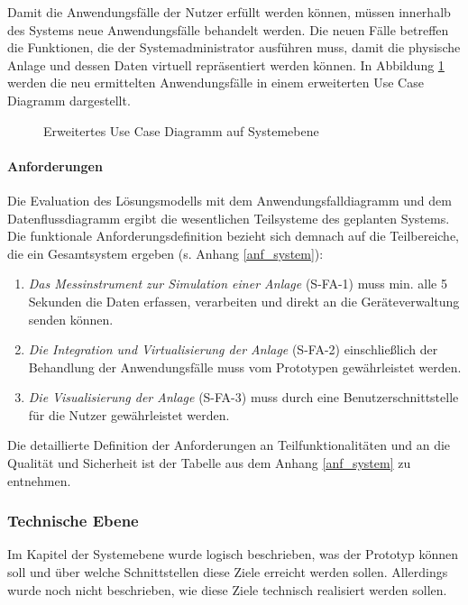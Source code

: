 Damit die Anwendungsfälle der Nutzer erfüllt werden können, müssen innerhalb des Systems neue Anwendungsfälle behandelt werden. Die neuen Fälle betreffen die Funktionen, die der Systemadministrator ausführen muss, damit die physische Anlage und dessen Daten virtuell repräsentiert werden können. In Abbildung \ref{usecasediagram} werden die neu ermittelten Anwendungsfälle in einem erweiterten Use Case Diagramm dargestellt.

\begin{figure}[ht!]
  \centering
  \noindent{}
  \caption[Erweitertes Use Case Diagramm auf Systemebene]{Erweitertes Use Case Diagramm auf Systemebene}
  \label{usecasediagram}
\end{figure}
\paragraph{Anforderungen}

Die Evaluation des Lösungsmodells mit dem Anwendungsfalldiagramm und dem Datenflussdiagramm ergibt die wesentlichen Teilsysteme des geplanten Systems. Die funktionale Anforderungsdefinition bezieht sich demnach auf die Teilbereiche, die ein Gesamtsystem ergeben (s. Anhang \ref{anf_system}):
\begin{enumerate}
  \item \textit{Das Messinstrument zur Simulation einer Anlage} (S-FA-1) muss min. alle 5 Sekunden die Daten erfassen, verarbeiten und direkt an die Geräteverwaltung senden können.
  \item \textit{Die Integration und Virtualisierung der Anlage} (S-FA-2) einschließlich der Behandlung der Anwendungsfälle muss vom Prototypen gewährleistet werden.
  \item \textit{Die Visualisierung der Anlage} (S-FA-3) muss durch eine Benutzerschnittstelle für die Nutzer gewährleistet werden.
\end{enumerate}

\noindent Die detaillierte Definition der Anforderungen an Teilfunktionalitäten und an die Qualität und Sicherheit ist der Tabelle aus dem Anhang \ref{anf_system} zu entnehmen.

\subsubsection{Technische Ebene}
Im Kapitel der Systemebene wurde logisch beschrieben, was der Prototyp können soll und über welche Schnittstellen diese Ziele erreicht werden sollen. Allerdings wurde noch nicht beschrieben, wie diese Ziele technisch realisiert werden sollen.

